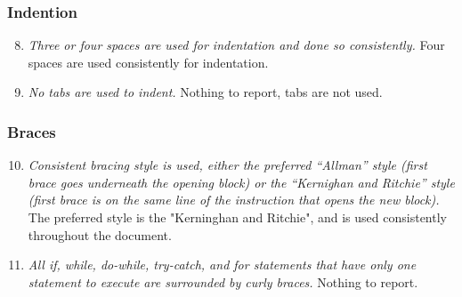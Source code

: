 	\subsubsection{Indention}
		\begin{enumerate}
			\setcounter{enumi}{7}
			\item \textit{Three or four spaces are used for indentation and done so consistently.}\newline
			Four spaces are used consistently for indentation. 

			\item \textit{No tabs are used to indent.}\newline
			Nothing to report, tabs are not used. 

		\end{enumerate}

	\subsubsection{Braces}
		\begin{enumerate}
			\setcounter{enumi}{9}
			\item \textit{Consistent bracing style is used, either the preferred “Allman” style (first brace goes underneath the opening block) or the “Kernighan and Ritchie” style (first brace is on the same line of the instruction that opens the new block).}\newline
			The preferred style is the "Kerninghan and Ritchie", and is used consistently throughout the document. %

			\item \textit{All if, while, do-while, try-catch, and for statements that have only one statement to execute are surrounded by curly braces.}
			Nothing to report. %
			
		\end{enumerate}

